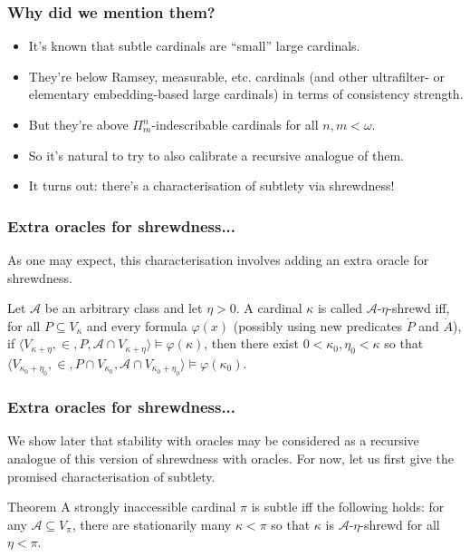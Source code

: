 \documentclass{beamer}
\begin{document}
\begin{frame}
\frametitle{Why did we mention them?}
\begin{itemize}
    \item It's known that subtle cardinals are ``small'' large cardinals.
    \item They're below Ramsey, measurable, etc. cardinals (and other ultrafilter- or elementary embedding-based large cardinals) in terms of consistency strength.
    \item But they're above $\Pi^n_m$-indescribable cardinals for all $n, m < \omega$.
    \item So it's natural to try to also calibrate a recursive analogue of them.
    \item It turns out: there's a characterisation of subtlety via shrewdness!
\end{itemize}
\end{frame}

\begin{frame}
\frametitle{Extra oracles for shrewdness...}
As one may expect, this characterisation involves adding an extra oracle for shrewdness. 

\begin{definition}
Let $\mathcal{A}$ be an arbitrary class and let $\eta > 0$. A cardinal $\kappa$ is called $\mathcal{A}$-$\eta$-shrewd iff, for all $P \subseteq V_\kappa$ and every formula $\varphi(x)$ (possibly using new predicates $\dot{P}$ and $\dot{A}$), if $\langle V_{\kappa+\eta}, \in, P, \mathcal{A} \cap V_{\kappa+\eta} \rangle \models \varphi(\kappa)$, then there exist $0 < \kappa_0, \eta_0 < \kappa$ so that $\langle V_{\kappa_0+\eta_0}, \in, P \cap V_{\kappa_0}, \mathcal{A} \cap V_{\kappa_0+\eta_0} \rangle \models \varphi(\kappa_0)$.
\end{definition}
\end{frame}

\begin{frame}
\frametitle{Extra oracles for shrewdness...}
We show later that stability with oracles may be considered as a recursive analogue of this version of shrewdness with oracles. For now, let us first give the promised characterisation of subtlety.

\begin{block}{Theorem}
A strongly inaccessible cardinal $\pi$ is subtle iff the following holds: for any $\mathcal{A} \subseteq V_\pi$, there are stationarily many $\kappa < \pi$ so that $\kappa$ is $\mathcal{A}$-$\eta$-shrewd for all $\eta < \pi$.
\end{block}
\end{frame}
\end{document}
